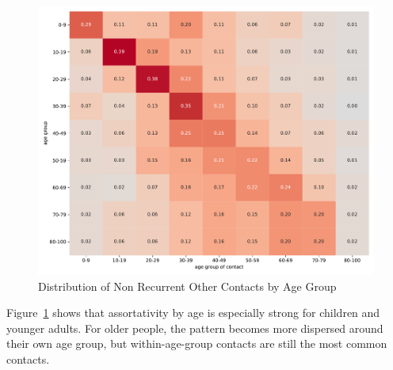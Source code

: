\begin{figure}[ht]
    \centering
    \includegraphics[width=0.9 \textwidth]{../figures/results/figures/data/assortativity_other_non_recurrent}
    \caption{Distribution of Non Recurrent Other Contacts by Age Group}
    \label{fig:assortativity_other}
\end{figure}


Figure~\ref{fig:assortativity_other} shows that assortativity by age is especially strong
for children and younger adults. For older people, the pattern becomes more dispersed
around their own age group, but within-age-group contacts are still the most common
contacts.

